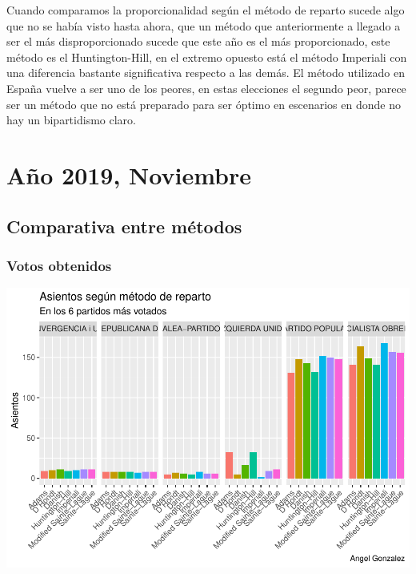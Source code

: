 \documentclass[12pt,a4paper,]{book}
\numberwithin{dummy}{section}
\theoremstyle{ocrenumbox}
\theoremstyle{blacknumex}
\theoremstyle{blacknumbox}
\theoremstyle{ocrenum}
\theoremstyle{ocrenum}
\begin{document}
Cuando comparamos la proporcionalidad según el método de reparto sucede
algo que no se había visto hasta ahora, que un método que anteriormente
a llegado a ser el más disproporcionado sucede que este año es el más
proporcionado, este método es el Huntington-Hill, en el extremo opuesto
está el método Imperiali con una diferencia bastante significativa
respecto a las demás. El método utilizado en España vuelve a ser uno de
los peores, en estas elecciones el segundo peor, parece ser un método
que no está preparado para ser óptimo en escenarios en donde no hay un
bipartidismo claro.

\hypertarget{auxf1o-2019-noviembre}{%
\section{Año 2019, Noviembre}\label{auxf1o-2019-noviembre}}

\hypertarget{comparativa-entre-muxe9todos-14}{%
\subsection{Comparativa entre
métodos}\label{comparativa-entre-muxe9todos-14}}

\hypertarget{votos-obtenidos-14}{%
\subsubsection{Votos obtenidos}\label{votos-obtenidos-14}}

\begin{center}\includegraphics[width=0.95\linewidth]{figurasR/unnamed-chunk-137-1} \end{center}
\end{document}
